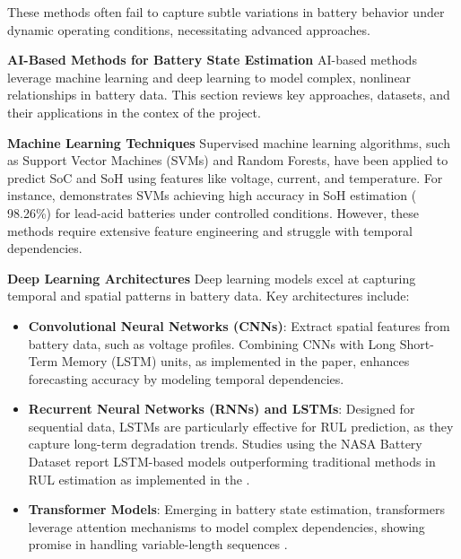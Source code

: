 These methods often fail to capture subtle variations in battery behavior under dynamic operating conditions, necessitating advanced approaches.

\textbf{AI-Based Methods for Battery State Estimation}
AI-based methods leverage machine learning and deep learning to model complex, nonlinear relationships in battery data. This section reviews key approaches, datasets, and their applications in the contex of the project.

\textbf{Machine Learning Techniques}
Supervised machine learning algorithms, such as Support Vector Machines (SVMs) and Random Forests, have been applied to predict SoC and SoH using features like voltage, current, and temperature. For instance, \cite{sun_simultaneous_2022} demonstrates SVMs achieving high accuracy in SoH estimation ( 98.26\%) for lead-acid batteries under controlled conditions. However, these methods require extensive feature engineering and struggle with temporal dependencies.

\textbf{Deep Learning Architectures}
Deep learning models excel at capturing temporal and spatial patterns in battery data. Key architectures include:
\begin{itemize}
    \item \textbf{Convolutional Neural Networks (CNNs)}: Extract spatial features from battery data, such as voltage profiles. Combining CNNs with Long Short-Term Memory (LSTM) units, as implemented in the \cite{Fangfang_Yang} paper, enhances forecasting accuracy by modeling temporal dependencies.
    \item \textbf{Recurrent Neural Networks (RNNs) and LSTMs}: Designed for sequential data, LSTMs are particularly effective for RUL prediction, as they capture long-term degradation trends. Studies using the NASA Battery Dataset \cite{noauthor_nasa_nodate} report LSTM-based models outperforming traditional methods in RUL estimation as implemented in the \cite{hong_state--health_2023}.
    \item \textbf{Transformer Models}: Emerging in battery state estimation, transformers leverage attention mechanisms to model complex dependencies, showing promise in handling variable-length sequences \cite{yilmaz_transformer-based_2025}.
\end{itemize}

